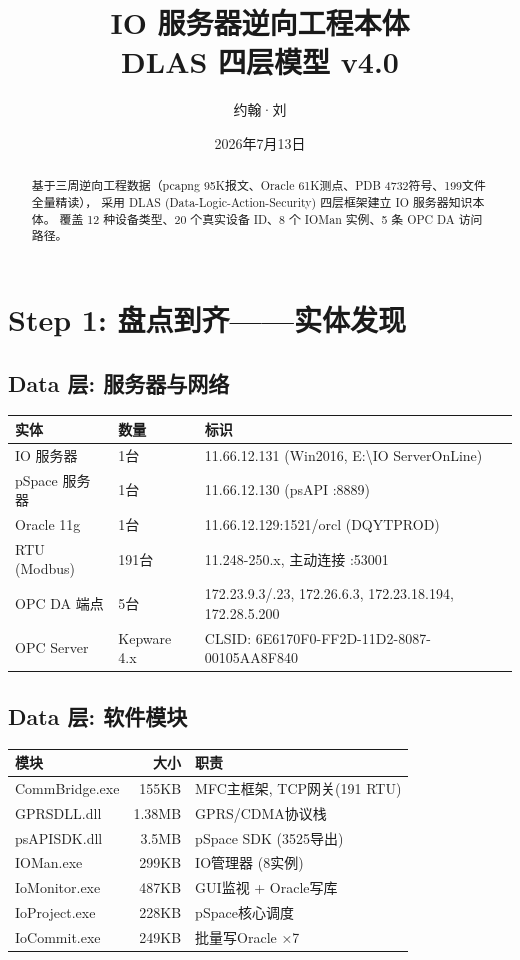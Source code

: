 \documentclass[12pt,a4paper]{ctexart}
\title{\textbf{IO 服务器逆向工程本体\\DLAS 四层模型 v4.0}}
\author{约翰·刘}
\date{2026年7月13日}
\begin{document}
\maketitle
\begin{abstract}
基于三周逆向工程数据（pcapng 95K报文、Oracle 61K测点、PDB 4732符号、199文件全量精读），
采用 DLAS (Data-Logic-Action-Security) 四层框架建立 IO 服务器知识本体。
覆盖 12 种设备类型、20 个真实设备 ID、8 个 IOMan 实例、5 条 OPC DA 访问路径。
\end{abstract}
\renewcommand{\abstractname}{摘要}

\section{Step 1: 盘点到齐——实体发现}

\subsection{Data 层: 服务器与网络}
\begin{table}[H]\centering
\begin{tabular}{lll}
\toprule
\textbf{实体} & \textbf{数量} & \textbf{标识} \\
\midrule
IO 服务器 & 1台 & 11.66.12.131 (Win2016, E:\textbackslash IO ServerOnLine) \\
pSpace 服务器 & 1台 & 11.66.12.130 (psAPI :8889) \\
Oracle 11g & 1台 & 11.66.12.129:1521/orcl (DQYTPROD) \\
RTU (Modbus) & 191台 & 11.248-250.x, 主动连接 :53001 \\
OPC DA 端点 & 5台 & 172.23.9.3/.23, 172.26.6.3, 172.23.18.194, 172.28.5.200 \\
OPC Server & Kepware 4.x & CLSID: 6E6170F0-FF2D-11D2-8087-00105AA8F840 \\
\bottomrule
\end{tabular}
\end{table}

\subsection{Data 层: 软件模块}
\begin{table}[H]\centering
\begin{tabular}{lrl}
\toprule
\textbf{模块} & \textbf{大小} & \textbf{职责} \\
\midrule
CommBridge.exe & 155KB & MFC主框架, TCP网关(191 RTU) \\
GPRSDLL.dll & 1.38MB & GPRS/CDMA协议栈 \\
psAPISDK.dll & 3.5MB & pSpace SDK (3525导出) \\
IOMan.exe & 299KB & IO管理器 (8实例) \\
IoMonitor.exe & 487KB & GUI监视 + Oracle写库 \\
IoProject.exe & 228KB & pSpace核心调度 \\
IoCommit.exe & 249KB & 批量写Oracle ×7 \\
\bottomrule
\end{tabular}
\end{table}
\end{document}
